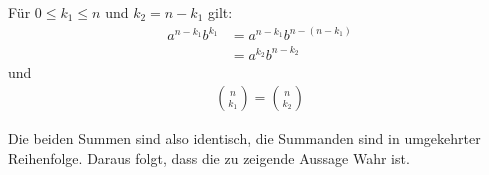 \documentclass[a4paper]{scrartcl}
\begin{document}
Für $0 \le k_1 \le n$ und $k_2 = n - k_1$ gilt:
\begin{align}
    a^{n-k_1} b^{k_1} &= a^{n - k_1} b^{n - (n - k_1)} \\
    &= a^{k_2} b^{n-k_2} 
\end{align}
und 
\begin{align*}
    \binom{n}{k_1} = \binom{n}{k_2}
\end{align*}

Die beiden Summen sind also identisch, die Summanden sind in umgekehrter Reihenfolge. 
Daraus folgt, dass die zu zeigende Aussage Wahr ist.
\end{document}
